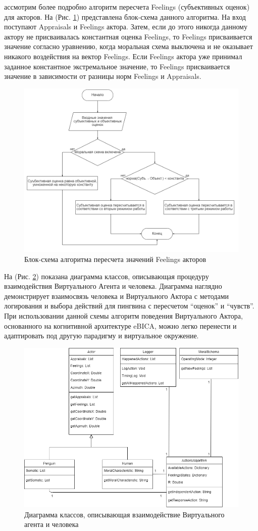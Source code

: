 ассмотрим более подробно алгоритм пересчета Feelings (субъективных оценок) для акторов. На (Рис. \ref{pic:oldcmodel1}) представлена блок-схема данного алгоритма. На вход поступают Appraisals и Feelings актора. 
Затем, если до этого никогда данному актору не присваивалась константная оценка Feelings, то Feelings присваивается значение согласно уравнению, 
когда моральная схема выключена и не оказывает никакого воздействия на вектор Feelings. 
Если Feelings актора уже принимал заданное константное экстремальное значение, то Feelings присваивается значение в зависимости от разницы норм Feelings и Appraisals.

\begin{figure}[h]
\includegraphics[width=0.75\columnwidth]{./img/oldcmodel1.png}
\centering
\caption{Блок-схема алгоритма пересчета значений Feelings акторов}
\label{pic:oldcmodel1}
\end{figure}

На (Рис. \ref{pic:oldcmodel2}) показана диаграмма классов, описывающая процедуру взаимодействия Виртуального Агента и человека. 
Диаграмма наглядно демонстрирует взаимосвязь человека и 
Виртуального Актора с методами логирования и выбора действий для пингвина с пересчетом “оценок” и “чувств”. 
При использовании данной схемы алгоритм поведения Виртуального Актора, основанного на когнитивной архитектуре eBICA, можно легко перенести и адаптировать 
под другую парадигму и виртуальное окружение.

\begin{figure}[h]
\includegraphics[width=0.75\columnwidth]{./img/oldcmodel2.png}
\centering
\caption{Диаграмма классов, описывающая взаимодействие Виртуального агента и человека}
\label{pic:oldcmodel2}
\end{figure}


